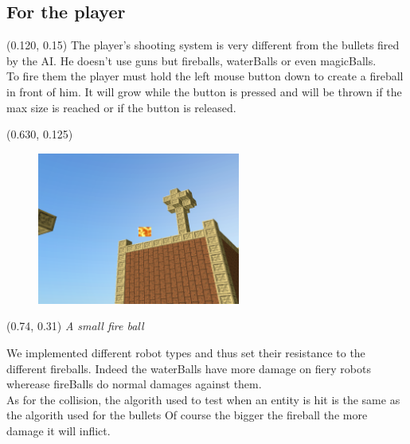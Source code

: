 \documentclass[article]{report}             %
\begin{document}
				\newpage
				\subsection{For the player}
				\begin{textblock}{0.508}(0.120, 0.15)
					The player's shooting system is very different from the bullets fired by the AI. He doesn't use guns but fireballs, waterBalls or even magicBalls. \\

					To fire them the player must hold the left mouse button down to create a fireball in front of him.
 				It will grow while the button is pressed and will be thrown if the max size is reached or if the button is released.\\
				\end{textblock}

				\begin{textblock}{0.628}(0.630, 0.125)
					\begin{figure}
						\includegraphics[height = 5cm]{images/Fireball.png}
					\end{figure}
				\end{textblock}
				
				\begin{textblock}{0.628}(0.74, 0.31)
					\it A small fire ball
				\end{textblock}
				
\bigskip\bigskip\bigskip\bigskip\bigskip\bigskip\bigskip\bigskip\bigskip\bigskip\bigskip\bigskip\bigskip\bigskip\bigskip

					We implemented different robot types and thus set their resistance to the different fireballs. Indeed the waterBalls have more damage on fiery robots wherease fireBalls do normal damages against them.\\

					As for the collision, the algorith used to test when an entity is hit is the same as the algorith used for the bullets Of course the bigger the fireball the more damage it will inflict.\\
\end{document}
